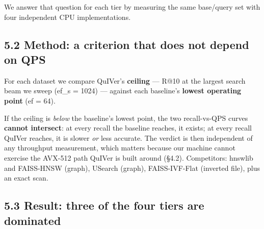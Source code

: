 \documentclass[
  10pt,
]{article}
\begin{document}
We answer that question for each tier by measuring the same base/query
set with four independent CPU implementations.

\subsection{5.2 Method: a criterion that does not depend on
QPS}\label{method-a-criterion-that-does-not-depend-on-qps}

For each dataset we compare QuIVer's \textbf{ceiling} --- R@10 at the
largest search beam we sweep (ef\_s = 1024) --- against each baseline's
\textbf{lowest operating point} (ef = 64).

If the ceiling is \emph{below} the baseline's lowest point, the two
recall-vs-QPS curves \textbf{cannot intersect}: at every recall the
baseline reaches, it exists; at every recall QuIVer reaches, it is
slower \emph{or} less accurate. The verdict is then independent of any
throughput measurement, which matters because our machine cannot
exercise the AVX-512 path QuIVer is built around (§4.2). Competitors:
hnswlib and FAISS-HNSW (graph), USearch (graph), FAISS-IVF-Flat
(inverted file), plus an exact scan.

\subsection{5.3 Result: three of the four tiers are
dominated}\label{result-three-of-the-four-tiers-are-dominated}
\end{document}
